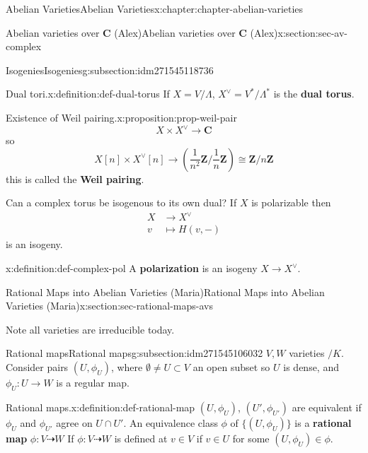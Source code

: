 \documentclass[oneside,10pt,]{book}
\newcommand{\terminology}[1]{\textbf{#1}}
\numberwithin{equation}{section}
\newcommand{\ZZ}{\mathbf{Z}}
\newcommand{\CC}{\mathbf{C}}
\newcommand{\amp}{&}
\begin{document}
\begin{chapterptx}{Abelian Varieties}{}{Abelian Varieties}{}{}{x:chapter:chapter-abelian-varieties}
\begin{sectionptx}{Abelian varieties over \(\CC\) (Alex)}{}{Abelian varieties over \(\CC\) (Alex)}{}{}{x:section:sec-av-complex}
\begin{subsectionptx}{Isogenies}{}{Isogenies}{}{}{g:subsection:idm271545118736}
\begin{definition}{Dual tori.}{x:definition:def-dual-torus}%
If \(X = V/\Lambda\), \(X^\vee = V^*/ \Lambda^*\) is the \terminology{dual torus}.%
\end{definition}
\begin{proposition}{Existence of Weil pairing.}{}{x:proposition:prop-weil-pair}%
%
\begin{equation*}
X\times X^\vee \to \CC
\end{equation*}
so%
\begin{equation*}
X[n] \times X^\vee[n] \to \left(\frac{1}{n^2} \ZZ/\frac{1}{n} \ZZ\right) \cong \ZZ/n\ZZ
\end{equation*}
this is called the \terminology{Weil pairing}.%
\end{proposition}
Can a complex torus be isogenous to its own dual? If \(X\) is polarizable then%
\begin{align*}
X \amp\to X^\vee\\
v\amp\mapsto H(v,-)
\end{align*}
is an isogeny.%
\begin{definition}{}{x:definition:def-complex-pol}%
A \terminology{polarization} is an isogeny \(X \to X^\vee\).%
\end{definition}
\end{subsectionptx}
\end{sectionptx}
%
%
\typeout{************************************************}
\typeout{************************************************}
%
\begin{sectionptx}{Rational Maps into Abelian Varieties (Maria)}{}{Rational Maps into Abelian Varieties (Maria)}{}{}{x:section:sec-rational-maps-avs}
\begin{introduction}{}%
Note all varieties are irreducible today.%
\end{introduction}%
%
%
\typeout{************************************************}
\typeout{************************************************}
%
\begin{subsectionptx}{Rational maps}{}{Rational maps}{}{}{g:subsection:idm271545106032}
\(V,W\) varieties \(/K\). Consider pairs \((U,\phi_U)\), where \(\emptyset \ne  U \subset V\) an open subset so \(U\) is dense, and \(\phi_U \colon U \to W\) is a regular map.%
\begin{definition}{Rational maps.}{x:definition:def-rational-map}%
\((U,\phi_U)\), \((U',{\phi_{U'}})\) are equivalent if \(\phi_U\) and \(\phi_{U'}\) agree on \(U \cap U'\). An equivalence class \(\phi\) of \(\{(U, \phi_U)\}\) is a \terminology{rational map} \(\phi \colon V \dashrightarrow W\) If \(\phi\colon V \dashrightarrow W\) is defined at   \(v\in V\) if \(v\in U\) for some \((U,\phi_U) \in \phi\).%

\end{definition}
\end{subsectionptx}
\end{sectionptx}
\end{chapterptx}
\end{document}
